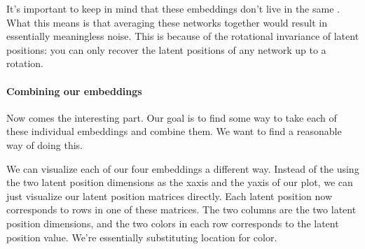 \documentclass[letterpaper,10pt,english]{jupyterBook}
\begin{document}
\begin{sphinxVerbatim}[commandchars=\\\{\}]
     

  \PYG{p}{[}   \PYG{p}{]}
  \PYG{p}{[}\PYG{p}{]}
   
      
      
\end{sphinxVerbatim}

\noindent{}

\sphinxAtStartPar
It’s important to keep in mind that these embeddings don’t live in the same . What this means is that averaging these networks together would result in essentially meaningless noise. This is because of the rotational invariance of latent positions: you can only recover the latent positions of any network up to a rotation.


\paragraph{Combining our embeddings}
\label{\detokenize{representations/ch6/multigraph-representation-learning:combining-our-embeddings}}
\sphinxAtStartPar
Now comes the interesting part. Our goal is to find some way to take each of these individual embeddings and combine them. We want to find a reasonable way of doing this.

\sphinxAtStartPar
We can visualize each of our four embeddings a different way. Instead of the using the two latent position dimensions as the x\sphinxhyphen{}axis and the y\sphinxhyphen{}axis of our plot, we can just visualize our latent position matrices directly. Each latent position now corresponds to rows in one of these matrices. The two columns are the two latent position dimensions, and the two colors in each row corresponds to the latent position value. We’re essentially substituting location for color.
\end{document}

